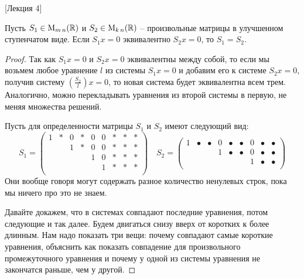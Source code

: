 [Лекция 4]


\begin{claim}
Пусть $S_1\in\operatorname{M}_{m\,n}(\mathbb R)$ и $S_2\in\operatorname{M}_{k\,n}(\mathbb R)$ -- произвольные матрицы в улучшенном ступенчатом виде.
Если $S_1x = 0$ эквивалентно $S_2x=0$, то $S_1 = S_2$.
\end{claim}
\begin{proof}
Так как $S_1 x = 0$ и $S_2x = 0$ эквивалентны между собой, то если мы возьмем любое уравнение $l$ из системы $S_1 x = 0$ и добавим его к системе $S_2 x = 0$, получив систему $\left(\frac{S_2}{l}\right)x=0$, то новая система будет эквивалентна всем трем.
Аналогично, можно перекладывать уравнения из второй системы в первую, не меняя множества решений.

Пусть для определенности матрицы $S_1$  и $S_2$ имеют следующий вид:
\[
S_1 = 
\begin{pmatrix}
{1}&{*}&{0}&{*}&{0}&{0}&{*}&{*}&{*}\\
{}&{}&{1}&{*}&{0}&{0}&{*}&{*}&{*}\\
{}&{}&{}&{}&{1}&{0}&{*}&{*}&{*}\\
{}&{}&{}&{}&{}&{1}&{*}&{*}&{*}\\
\end{pmatrix}\quad
S_2 = 
\begin{pmatrix}
{1}&{\bullet}&{\bullet}&{0}&{\bullet}&{\bullet}&{0}&{\bullet}&{\bullet}\\
{}&{}&{}&{1}&{\bullet}&{\bullet}&{0}&{\bullet}&{\bullet}\\
{}&{}&{}&{}&{}&{}&{1}&{\bullet}&{\bullet}\\
\end{pmatrix}
\]
Они вообще говоря могут содержать разное количество ненулевых строк, пока мы ничего про это не знаем.

Давайте докажем, что в системах совпадают последние уравнения, потом следующие и так далее.
Будем двигаться снизу вверх от коротких к более длинным.
Нам надо показать три вещи: почему совпадают самые короткие уравнения, объяснить как показать совпадение для произвольного промежуточного уравнения и почему у одной из системы уравнения не закончатся раньше, чем у другой.


\end{proof}
